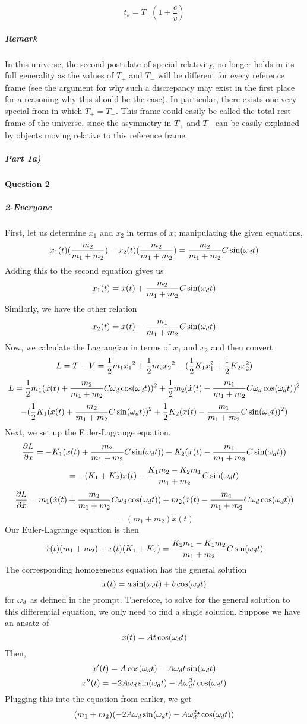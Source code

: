 \[ t_s = T_+(1+\frac{c}{v}) \]
\subparagraph*{Remark}
In this universe, the second postulate of special relativity, no longer holds in its full generality as the values of $T_+$ and $T_-$ will be different for every reference frame (see the argument for why such a discrepancy may exist in the first place for a reasoning why this should be the case). In particular, there exists one very special from in which $T_+=T_-$. This frame could easily be called the total rest frame of the universe, since the asymmetry in $T_+$ and $T_-$ can be easily explained by objects moving relative to this reference frame.
\subparagraph*{Part 1a)}
\paragraph{Question 2}
\subparagraph{2-Everyone}
First, let us determine $x_1$ and $x_2$ in terms of $x$; manipulating the given equations,
$$x_1(t)(\frac{m_2}{m_1+m_2})-x_2(t)(\frac{m_2}{m_1+m_2})=\frac{m_2}{m_1+m_2} C\sin(\omega_d t)$$
Adding this to the second equation gives us
$$x_1(t)=x(t)+\frac{m_2}{m_1+m_2} C\sin(\omega_d t)$$
Similarly, we have the other relation
$$x_2(t)=x(t)-\frac{m_1}{m_1+m_2}C\sin(\omega_d t)$$
Now, we calculate the Lagrangian in terms of $x_1$ and $x_2$ and then convert
$$L=T-V=\frac 1 2 m_1 \dot{x_1}^2+\frac 1 2 m_2 \dot{x_2}^2-(\frac 1 2 K_1 x_1^2+\frac 1 2 K_2 x_2^2)$$
$$L=\frac 1 2 m_1(\dot x(t)+\frac{m_2}{m_1+m_2} C\omega_d \cos(\omega_d t))^2+\frac 1 2 m_2(\dot x(t) -\frac{m_1}{m_1+m_2} C\omega_d \cos(\omega_d t))^2$$
$$-(\frac 1 2 K_1 (x(t)+\frac{m_2}{m_1+m_2} C\sin(\omega_d t))^2+\frac 1 2 K_2 ( x(t)-\frac{m_1}{m_1+m_2} C\sin(\omega_d t))^2)$$
Next, we set up the Euler-Lagrange equation.
$$\frac{\partial L}{\partial x}=-K_1 (x(t)+\frac{m_2}{m_1+m_2}C\sin(\omega_d t))-K_2 (x(t)-\frac{m_1}{m_1+m_2} C\sin(\omega_d t))$$
$$=-(K_1+K_2) x(t)-\frac{K_1 m_2-K_2 m_1}{m_1+m_2}C \sin(\omega_d t)$$
$$\frac{\partial L}{\partial \dot x} = m_1 (\dot x(t)+\frac{m_2}{m_1+m_2} C \omega_d \cos(\omega_d t))+m_2  (\dot x(t)-\frac{m_1}{m_1+m_2} C \omega_d \cos(\omega_d t))$$
$$= (m_1+m_2) \dot x(t)$$
Our Euler-Lagrange equation is then
$$\ddot x(t) (m_1+m_2)+ x(t) (K_1+K_2)=\frac{K_2 m_1-K_1 m_2}{m_1+m_2} C \sin(\omega_d t)$$
The corresponding homogeneous equation has the general solution
$$x(t)= a \sin(\omega_d t)+b\cos(\omega_d t)$$
for $\omega_d$ as defined in the prompt.  Therefore, to solve for the general solution to this differential equation, we only need to find a single solution.  Suppose we have an ansatz of
$$x(t)=A t\cos(\omega_d t)$$
Then, 
$$x'(t)= A\cos(\omega_d t)-A\omega_d t\sin(\omega_d t)$$
$$x''(t)=-2A\omega_d \sin(\omega_d t)-A\omega_d^2 t \cos(\omega_d t)$$
Plugging this into the equation from earlier, we get
$$(m_1+m_2)(-2A\omega_d \sin(\omega_d t)-A\omega_d^2 t \cos(\omega_d t))$$
